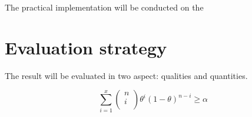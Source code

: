 The practical implementation will be conducted on the
\section{Evaluation strategy}
The result will be evaluated in two aspect: qualities and quantities.

\begin{equation}
       \sum_{i=1}^{x} 
       \begin{pmatrix}
       n\\
       i\\
       \end{pmatrix}
       \theta^{i}(1-\theta)^{n-i}\ge\alpha
\end{equation}

